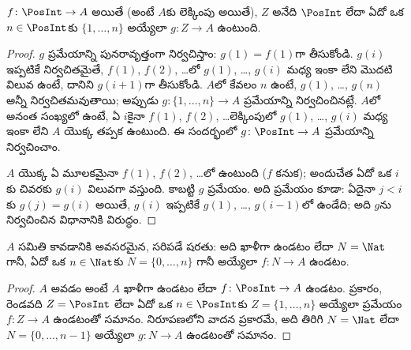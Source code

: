 \documentclass[../../../include/open-logic-section]{subfiles}
\begin{document}
\begin{prop}
$f\colon \PosInt \to A$  అయితే (అంటే $A$కు లెక్కింపు
అయితే), $Z$ అనేది $\PosInt$ లేదా ఏదో ఒక $n \in \PosInt$కు
$\{1, \dots, n\}$ అయ్యేలా  $g\colon Z \to A$ ఉంటుంది.
\end{prop}

\begin{proof}
  $g$ ప్రమేయాన్ని పునరావృత్తంగా నిర్వచిస్తాం: $g(1) = f(1)$గా
  తీసుకోండి. $g(i)$ ఇప్పటికే నిర్వచితమైతే, $f(1)$, $f(2)$, \dots{}లో
  $g(1)$, \dots, $g(i)$ మధ్య ఇంకా లేని మొదటి విలువ ఉంటే, దానిని
  $g(i+1)$గా తీసుకోండి. $A$లో కేవలం $n$  ఉంటే,
  $g(1)$, \dots, $g(n)$ అన్నీ నిర్వచితమవుతాయి; అప్పుడు
  $g\colon \{1, \dots, n\} \to A$ ప్రమేయాన్ని నిర్వచించినట్లే.
  $A$లో అనంత సంఖ్యలో  ఉంటే, ఏ $i$కైనా $f(1)$, $f(2)$,
  \dots లెక్కింపులో $g(1)$, \dots, $g(i)$ మధ్య ఇంకా లేని
  $A$ యొక్క  తప్పక ఉంటుంది. ఈ సందర్భంలో
  $g\colon \PosInt \to A$ ప్రమేయాన్ని నిర్వచించాం.

  $A$ యొక్క ఏ మూలకమైనా $f(1)$, $f(2)$, \dots{}లో ఉంటుంది ($f$
   కనుక); అందుచేత ఏదో ఒక $i$కు చివరకు $g(i)$ విలువగా
  వస్తుంది. కాబట్టి $g$  ప్రమేయం. అది  ప్రమేయం కూడా:
  ఏదైనా $j < i$కు $g(j) = g(i)$ అయితే, $g(i)$ ఇప్పటికే
  $g(1)$, \dots, $g(i-1)$లో ఉండేది; అది $g$ను నిర్వచించిన విధానానికి
  విరుద్ధం.
\end{proof}

\begin{cor}
$A$ సమితి  కావడానికి అవసరమైన, సరిపడే షరతు:
అది ఖాళీగా ఉండటం లేదా $N = \Nat$ గానీ, ఏదో ఒక $n \in \Nat$కు
$N = \{0, \dots, n\}$ గానీ అయ్యేలా 
$f\colon N \to A$ ఉండటం.
\end{cor}

\begin{proof}
$A$  అవడం అంటే $A$ ఖాళీగా ఉండటం లేదా 
$f\colon \PosInt \to A$ ఉండటం.  ప్రకారం, రెండవది
$Z = \PosInt$ లేదా ఏదో ఒక $n \in \PosInt$కు
$Z = \{1, \dots, n\}$ అయ్యేలా  ప్రమేయం
$f\colon Z \to A$ ఉండటంతో సమానం.  నిరూపణలోని
వాదన ప్రకారమే, అది తిరిగి $N = \Nat$ లేదా
$N = \{0, \dots, n-1\}$ అయ్యేలా  $g\colon N \to A$
ఉండటంతో సమానం.
\end{proof}
\end{document}
